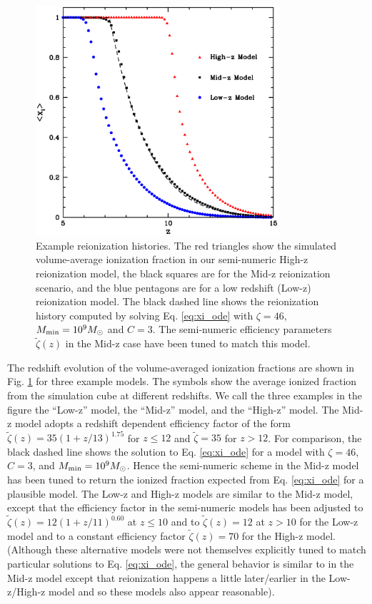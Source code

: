 \begin{figure}
\bc
\includegraphics[width=9cm]{f1.eps}
\caption{Example reionization histories. The red triangles show the simulated volume-average ionization fraction in our semi-numeric High-z reionization model, the
black squares are for the Mid-z reionization scenario, and the blue pentagons are for a low redshift (Low-z) reionization model. The black dashed line shows the reionization
history computed by solving Eq. \ref{eq:xi_ode} with $\zeta=46$, $M_{\rm min} = 10^9 M_\odot$ and $C=3$. The semi-numeric
efficiency parameters $\tilde{\zeta}(z)$ in the Mid-z case have been tuned to match this model.}
\label{fig:xi_examp}
\ec
\end{figure}

The redshift evolution of the volume-averaged ionization fractions are shown in Fig. \ref{fig:xi_examp} for three example models. The symbols
show the average ionized fraction from the simulation cube at different redshifts. We call the three examples in the
figure the ``Low-z'' model, the ``Mid-z'' model, and the ``High-z'' model. The Mid-z model adopts a redshift dependent efficiency factor
of the form $\tilde{\zeta}(z) = 35 (1+z/13)^{1.75}$ for $z \leq 12$ and $\tilde{\zeta}=35$ for $z > 12$.
For comparison, the black dashed line shows
the solution to Eq. \ref{eq:xi_ode} for a model with $\zeta=46$, $C=3$, and $M_{\rm min} = 10^9 M_\odot$. Hence the semi-numeric scheme
in the Mid-z model has been tuned to return the ionized fraction expected from Eq. \ref{eq:xi_ode} for a plausible model.
The Low-z and High-z models are similar to the Mid-z model, except that
the efficiency factor in the semi-numeric models has been adjusted to $\tilde{\zeta}(z)=12 (1+z/11)^{0.60}$ at $z \leq 10$ and to
$\tilde{\zeta}(z)=12$ at $z > 10$ for the Low-z model and to a constant efficiency factor $\tilde{\zeta}(z)=70$ for the High-z model. (Although these 
alternative models were not themselves explicitly tuned to match particular solutions to Eq. \ref{eq:xi_ode}, the general
behavior is similar to in the Mid-z model except that reionization happens a little later/earlier in the Low-z/High-z model and
so these models also appear reasonable).

